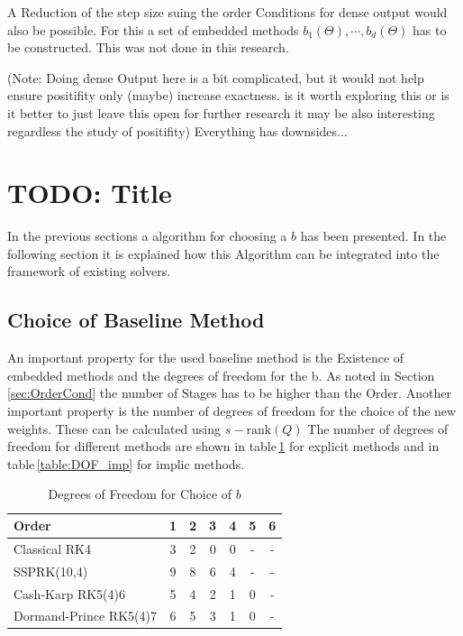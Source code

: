 \documentclass{article}
\begin{document}
A Reduction of the step size suing the order Conditions for dense output would also be possible. For this a set of embedded methods $b_1(\Theta),\cdots,b_d(\Theta)$ has to be constructed. This was not done in this research.

(Note: Doing dense Output here is a bit complicated, but it would not help ensure positifity only (maybe) increase exactness.  is it worth exploring this or is it better to just leave this open for further research it may be also interesting regardless the study of positifity)
Everything has downsides...
 

\section{TODO: Title} \label{sec:integration}

In the previous sections a algorithm for choosing a $b$ has been presented. 
In the following section it is explained how this Algorithm can be integrated into the framework of existing solvers.

\subsection{Choice of Baseline Method}
An important property for the used baseline method is the Existence of embedded methods and the degrees of freedom for the b.
As noted in Section\,\ref{sec:OrderCond} the number of Stages has to be higher than the Order. 
Another important property is the number of degrees of freedom for the choice of the new weights. 
These can be calculated using $s-\mathrm{rank}(Q)$%
The number of degrees of freedom for different methods are shown in table\,\ref{table:DOF_exp} for explicit methods and in table\,\ref{table:DOF_imp} for implic methods.

\begin{table}[h!]
\centering    %
\begin{tabular}{|l |c c c c c c |} 
 \hline 
Order &1&2&3&4&5&6 \\ 
 \hline Classical RK4&3&2&0&0& - & -  \\ 
 SSPRK(10,4)&9&8&6&4& - & -  \\ 
 Cash-Karp RK5(4)6&5&4&2&1&0& -  \\ 
 Dormand-Prince RK5(4)7&6&5&3&1&0& -  \\ 
 \hline 
 \end{tabular}
 \caption{Degrees of Freedom for Choice of $b$} %
 \label{table:DOF_exp}
 \end{table}
 
\end{document}
